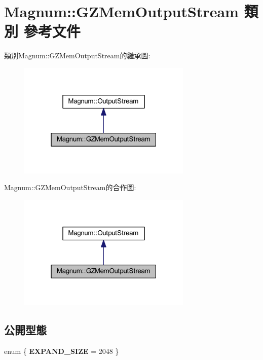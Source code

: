 \hypertarget{class_magnum_1_1_g_z_mem_output_stream}{}\section{Magnum\+:\+:G\+Z\+Mem\+Output\+Stream 類別 參考文件}
\label{class_magnum_1_1_g_z_mem_output_stream}


類別\+Magnum\+:\+:G\+Z\+Mem\+Output\+Stream的繼承圖\+:\nopagebreak
\begin{figure}[H]
\begin{center}
\leavevmode
\includegraphics[width=235pt]{class_magnum_1_1_g_z_mem_output_stream__inherit__graph}
\end{center}
\end{figure}


Magnum\+:\+:G\+Z\+Mem\+Output\+Stream的合作圖\+:\nopagebreak
\begin{figure}[H]
\begin{center}
\leavevmode
\includegraphics[width=235pt]{class_magnum_1_1_g_z_mem_output_stream__coll__graph}
\end{center}
\end{figure}
\subsection*{公開型態}
\begin{DoxyCompactItemize}
\item 
enum \{ {\bfseries E\+X\+P\+A\+N\+D\+\_\+\+S\+I\+ZE} = 2048
 \}\hypertarget{class_magnum_1_1_g_z_mem_output_stream_a6d0ab598b7601e34a92050b8efe9f0c9}{}\label{class_magnum_1_1_g_z_mem_output_stream_a6d0ab598b7601e34a92050b8efe9f0c9}

\end{DoxyCompactItemize}
